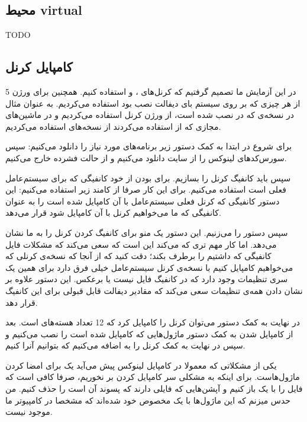 \subsection{محیط‌ virtual}
TODO

\subsection{کامپایل کرنل}
در این آزمایش ما تصمیم گرفتیم که کرنل‌های
،  و 
استفاده کنیم. همچنین برای ورژن 5 از هر چیزی که بر روی سیستم بای دیفالت نصب بود استفاده می‌کردیم.
به عنوان مثال در نسخه‌ی
که در
نصب شده است، از ورژن کرنل
استفاده می‌کردیم و در ماشین‌های مجازی که از
استفاده می‌کردند از نسخه‌های
استفاده می‌کردیم.

برای شروع در ابتدا به کمک دستور زیر برنامه‌های مورد نیاز را دانلود می‌کنیم:
سپس سورس‌کد‌های لینوکس را از سایت
دانلود می‌کنیم و از حالت فشرده خارج می‌کنیم.

سپس باید کانفیگ کرنل را بسازیم. برای
بودن از خود کانفیگی که برای سیستم‌عامل فعلی است استفاده می‌کنیم. برای این کار صرفا از کامند زیر
استفاده می‌کنیم:
این دستور کانفیگی که کرنل فعلی سیستم‌عامل با آن کامپایل شده است را به عنوان کانفیگی که ما می‌خواهیم
کرنل با آن کامپایل شود قرار می‌دهد.

سپس دستور
را می‌زنیم. این دستور یک منو برای کانفیگ کردن کرنل را به ما نشان می‌دهد. اما کار مهم تری که می‌کند این است که
سعی می‌کند که مشکلات فایل کانفیگی که داشتیم را برطرف بکند؛ دقت کنید که از آنجا که نسخه‌ی کرنلی که می‌خواهیم
کامپایل کنیم با نسخه‌ی کرنل سیستم‌عامل خیلی فرق دارد برای همین یک سری تنظیمات وجود دارد که در کانفیگ فایل نیست
یا برعکس. این دستور علاوه بر نشان دادن همه‌ی تنظیمات سعی می‌کند که مقادیر دیفالت قابل قبولی برای
این کانفیگ قرار دهد.

در نهایت به کمک دستور
می‌توان کرنل را کامپایل کرد که 12 تعداد هسته‌های
است. بعد از کامپایل شدن به کمک دستور
ماژول‌هایی که کامپایل شده است را نصب می‌کنیم و سپس در نهایت به کمک
کرنل را به
اضافه می‌کنیم که بتوانیم آنرا
کنیم.

یکی از مشکلاتی که معمولا در کامپایل لینوکس پیش می‌آید یک
برای امضا کردن ماژول‌هاست. برای اینکه به مشکلی سر کامپایل کردن بر نخوریم، صرفا کافی است که فایل
را با یک
باز کنیم و آپشن‌هایی که فایلی دارند که پسوند آن
است را حذف کنیم. من حدس میزنم که این ماژول‌ها با یک
مخصوص خود
شده‌اند که مشخصا در کامپیوتر ما موجود نیست.

